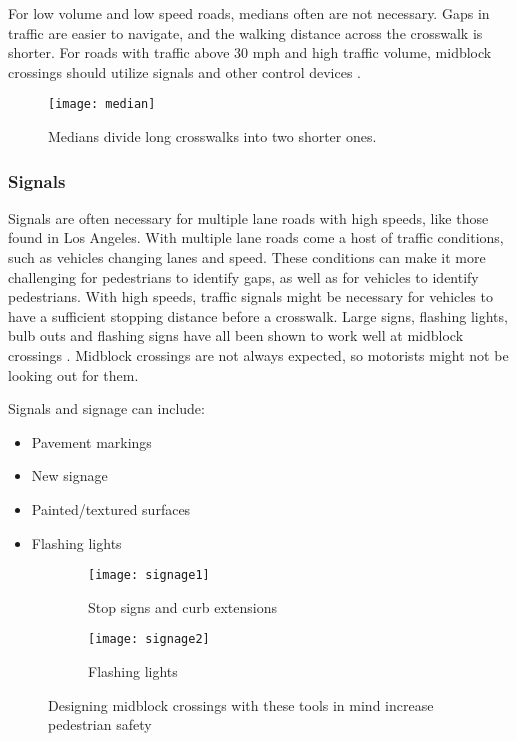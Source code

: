 For low volume and low speed roads, medians often are not necessary.  Gaps in traffic are easier to navigate, and the walking distance across the crosswalk is shorter.  For roads with traffic above 30 mph and high traffic volume, midblock crossings should utilize signals and other control devices \cite{mid2}.

\begin{figure}[!htbp]
\centering
\texttt{[image: median]}
\caption[Median]{Medians divide long crosswalks into two shorter ones.}\label{fig:median}
\end{figure}

\subsubsection{Signals}
Signals are often necessary for multiple lane roads with high speeds, like those found in Los Angeles.   With multiple lane roads come a host of traffic conditions, such as vehicles changing lanes and speed.  These conditions can make it more challenging for pedestrians to identify gaps, as well as for vehicles to identify pedestrians.  With high speeds, traffic signals might be necessary for vehicles to have a sufficient stopping distance before a crosswalk.  Large signs, flashing lights, bulb outs and flashing signs have all been shown to work well at midblock crossings \cite{mid3}.  Midblock crossings are not always expected, so motorists might not be looking out for them.

Signals and signage can include:\begin{itemize}
	\item Pavement markings 
	\item New signage 
	\item Painted/textured surfaces 
	\item Flashing lights 
\end{itemize}

\begin{figure}[!htbp]
\centering
        \begin{subfigure}[t]{0.45\textwidth}
                \texttt{[image: signage1]}
                \caption{Stop signs and curb extensions}
                \label{fig:midsignage1}
        \end{subfigure}
        \begin{subfigure}[t]{0.45\textwidth}
                \texttt{[image: signage2]}
                \caption{Flashing lights}
                \label{fig:midsignage2}
        \end{subfigure}
\caption[Midblock Crossing Design Tools]{Designing midblock crossings with these tools in mind increase pedestrian safety\cite{mid4}}
\end{figure}


